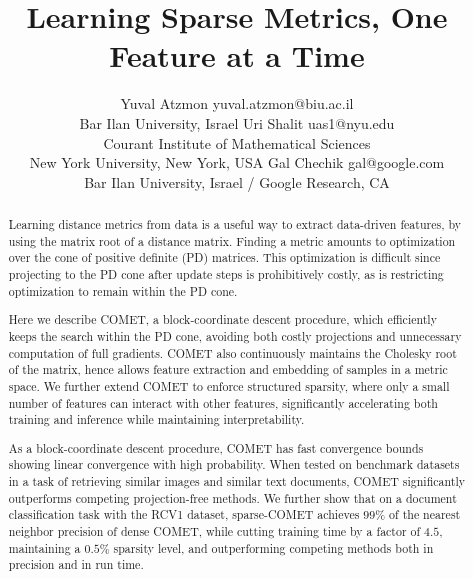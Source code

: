 \documentclass[twoside,11pt]{article}
\begin{document}
\title{Learning Sparse Metrics, One Feature at a Time}


\author{\name Yuval Atzmon \email yuval.atzmon@biu.ac.il \\
       \addr Bar Ilan University, Israel
       \AND
       \name Uri Shalit \email uas1@nyu.edu \\
       \addr Courant Institute of Mathematical Sciences \\
       New York University, New York, USA
       \AND
      \name Gal Chechik \email gal@google.com \\
       \addr Bar Ilan University, Israel / Google Research, CA}
\editor{ }

\maketitle
\vskip -15pt
\begin{abstract}%

Learning distance metrics from data is a useful way to extract data-driven features, by using the matrix root of a distance matrix. Finding a metric amounts to optimization over the cone of positive definite (PD) matrices. This optimization is difficult since projecting to the PD cone after update steps is prohibitively costly, as is restricting optimization to remain within the PD cone.

Here we describe COMET, a block-coordinate descent procedure, which efficiently keeps the search within the PD cone, avoiding both costly projections and unnecessary computation of full gradients. COMET also continuously maintains the Cholesky root of the matrix, hence allows feature extraction and embedding of samples in a metric space. We further extend COMET to enforce structured sparsity, where only a small number of features can interact with other features, significantly accelerating both training and inference while maintaining interpretability. 
 
As a block-coordinate descent procedure, COMET has fast convergence bounds showing linear convergence with high probability. When tested on benchmark datasets in a task of retrieving similar images and similar text documents, COMET significantly outperforms competing projection-free methods. We further show that on a document classification task with the RCV1 dataset, sparse-COMET achieves $99\%$ of the nearest neighbor precision of dense COMET, while cutting training time by a factor of $4.5$, maintaining a $0.5\%$ sparsity level, and outperforming competing methods both in precision and in run time. 
\end{abstract}
\end{document}
